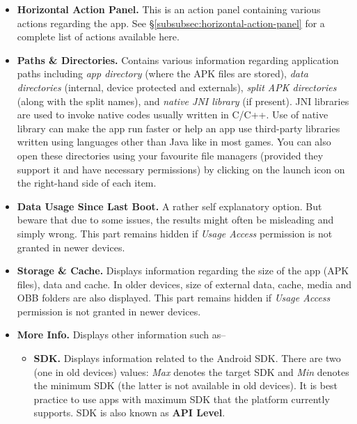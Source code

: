 \begin{itemize}
    \item \textbf{Horizontal Action Panel.} This is an action panel containing various actions regarding the app. See
    §\cref{subsubsec:horizontal-action-panel} for a complete list of actions available here.

    \item \textbf{Paths \& Directories.} Contains various information regarding application paths including \textit{app
    directory} (where the APK files are stored), \textit{data directories} (internal, device protected and externals),
    \textit{split APK directories} (along with the split names), and \textit{native JNI library} (if present). JNI
    libraries are used to invoke native codes usually written in C/C++. Use of native library can make the app run
    faster or help an app use third-party libraries written using languages other than Java like in most games. You can
    also open these directories using your favourite file managers (provided they support it and have necessary
    permissions) by clicking on the launch icon on the right-hand side of each item.

    \item \textbf{Data Usage Since Last Boot.} A rather self explanatory option. But beware that due to some issues, the
    results might often be misleading and simply wrong. This part remains hidden if \textit{Usage Access} permission is
    not granted in newer devices.

    \item \textbf{Storage \& Cache.} Displays information regarding the size of the app (APK files), data and cache. In
    older devices, size of external data, cache, media and OBB folders are also displayed. This part remains hidden if
    \textit{Usage Access} permission is not granted in newer devices.

    \item \textbf{More Info.} Displays other information such as--
    \begin{itemize}
        \item \textbf{SDK.} Displays information related to the Android SDK. There are two (one in old devices) values:
        \textit{Max} denotes the target SDK and \textit{Min} denotes the minimum SDK (the latter is not available in old
        devices). It is best practice to use apps with maximum SDK that the platform currently supports. SDK is also
        known as \textbf{API Level}.


\end{itemize}
\end{itemize}

